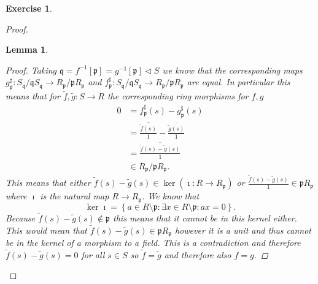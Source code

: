 \documentclass{article}
\newcommand{\primeid}{\mathfrak{p}}
\newcommand{\primeidd}{\mathfrak{q}}
\newcommand{\setwith}[2]{\left\{#1:#2\right\}}
\newcommand{\ideal}{\triangleleft}
\newtheorem{lemma}{Lemma}
\theoremstyle{definition}
\newtheorem{question}{Exercise}
\begin{document}
\begin{question}
\begin{enumerate}[(i)]
\begin{proof}
\begin{lemma}
\begin{proof}
                          Taking
                          \(\primeidd=f^{-1}[\primeid]=g^{-1}[\primeid]\ideal
                          S\) we know that the corresponding maps
                          \(g^{\sharp}_{\primeid}:S_{\primeidd}/\primeidd
                          S_{\primeidd}\to R_{\primeid}/\primeid R_{\primeid}\)
                          and \(f^{\sharp}_{\primeid}:S_{\primeidd}/\primeidd
                          S_{\primeidd}\to R_{\primeid}/\primeid R_{\primeid}\)
                          are equal. In particular this means that for
                          \(\tilde{f},\tilde{g}:S\to R\) the corresponding ring
                          morphisms for \(f,g\)
                          \begin{align*}
                              0 & =f^{\sharp}_{\primeid}(s)-g^{\sharp}_{\primeid}(s)                   \\
                                & =\overline{\frac{\tilde{f}(s)}{1}}-\overline{\frac{\tilde{g}(s)}{1}} \\
                                & =\overline{\frac{\tilde{f}(s)-\tilde{g}(s)}{1}}                      \\
                                & \in R_{\primeid}/\primeid R_{\primeid}.
                          \end{align*}
                          This means that either
                          \(\tilde{f}(s)-\tilde{g}(s)\in\ker(\imath:R\to
                          R_{\primeid})\) or
                          \(\frac{\tilde{f}(s)-\tilde{g}(s)}{1}\in\primeid
                          R_{\primeid}\) where \(\imath\) is the natural map
                          \(R\to R_{\primeid}\). We know that
                          \[
                              \ker\imath=\setwith{a\in R\setminus\primeid}{\exists x\in R\setminus\primeid:ax=0}.
                          \]
                          Because \(\tilde{f}(s)-\tilde{g}(s)\notin\primeid\)
                          this means that it cannot be in this kernel either.
                          This would mean that
                          \(\tilde{f}(s)-\tilde{g}(s)\in\primeid R_{\primeid}\)
                          however it is a unit and thus cannot be in the kernel
                          of a morphism to a field. This is a contradiction and
                          therefore \(\tilde{f}(s)-\tilde{g}(s)=0\) for all
                          \(s\in S\) so \(\tilde{f}=\tilde{g}\) and therefore
                          also \(f=g\).
                      \end{proof}
                  \end{lemma}


\end{proof}
\end{enumerate}
\end{question}
\end{document}
